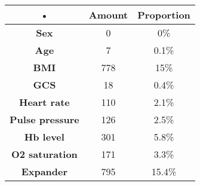 \begin{tabular}{|c|c|c|}
\hline 
• & \textbf{Amount} & \textbf{Proportion} \\ 
\hline
\textbf{Sex} & 0 & 0\% \\
\hline 
\textbf{Age} & 7 & 0.1\% \\
\hline 
\textbf{BMI} & 778 & 15\% \\ 
\hline
\textbf{GCS} & 18 & 0.4\% \\
\hline
\textbf{Heart rate} & 110 & 2.1\% \\ 
\hline 
\textbf{Pulse pressure} &  126 & 2.5\% \\ 
\hline 
\textbf{Hb level} &  301 & 5.8\% \\ 
\hline 
\textbf{O2 saturation} &  171 & 3.3\% \\ 
\hline 
\textbf{Expander} & 795 & 15.4\% \\ 
\hline 
\end{tabular} 